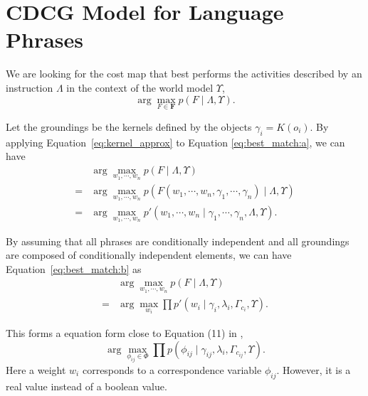 \documentclass[10pt,a4paper]{article}
\begin{document}
\section{CDCG Model for Language Phrases}

We are looking for the cost map that best performs the activities described by an instruction $ \Lambda $ in the context of the world model $ \Upsilon $,
\begin{equation}
\label{eq:best_match:a}
\arg \max_{ F \in \bm{F} } p( F \mid \Lambda , \Upsilon ).
\end{equation}

Let the groundings be the kernels defined by the objects
$ \gamma_i = K( o_i ) $.
By applying Equation~\eqref{eq:kernel_approx} to Equation \eqref{eq:best_match:a}, we can have
\begin{equation}
\label{eq:best_match:b}
\begin{aligned}
& \arg \max_{ w_1 , \cdots , w_n } p( F \mid \Lambda, \Upsilon ) \\
= & \arg \max_{ w_1 , \cdots , w_n } p( F( w_1 , \cdots , w_n , \gamma_1 , \cdots, \gamma_n ) \mid \Lambda, \Upsilon ) \\
= & \arg \max_{ w_1 , \cdots , w_n } p'( w_1 , \cdots , w_n \mid \gamma_1 , \cdots, \gamma_n, \Lambda, \Upsilon ).
\end{aligned}
\end{equation}

By assuming that all phrases are conditionally independent and all groundings are composed of conditionally independent elements, we can have Equation~\eqref{eq:best_match:b} as
\begin{equation}
\label{eq:best_match:c}
\begin{aligned}
& \arg \max_{ w_1 , \cdots , w_n } p( F \mid \Lambda, \Upsilon ) \\
= & \arg \max_{ w_i } \prod p'( w_i \mid \gamma_i , \lambda_i, \Gamma_{c_i} , \Upsilon ).
\end{aligned}
\end{equation}

This forms a equation form close to Equation (11) in \cite{howard2014natural},
\begin{equation}
\arg \max_{ \phi_{ij} \in \Phi } \prod p( \phi_{ij} \mid \gamma_{ij} , \lambda_i , \Gamma_{c_{ij}} , \Upsilon ).
\end{equation}
Here a weight $ w_i $ corresponds to a correspondence variable $ \phi_{ij} $.
However, it is a real value instead of a boolean value.
\end{document}
